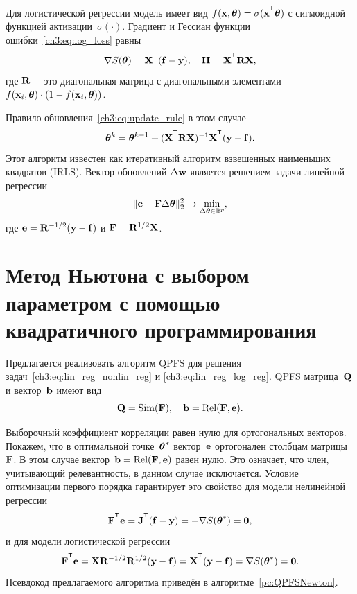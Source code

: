 Для логистической регрессии модель имеет вид $f(\bx , \btheta) = \sigma(\bx^{\T} \btheta)$ с сигмоидной функцией активации~$\sigma(\cdot)$.
Градиент и Гессиан функции ошибки~\eqref{ch3:eq:log_loss} равны
\begin{equation}
\nabla S(\btheta) = \bX^{\T} (\mathbf{f} - \by), \quad \bH = \bX^{\T} \bR \bX,
\label{ch3:eq:log_reg_deriv}
\end{equation}
где $\mathbf{R}$~-- это диагональная матрица с диагональными элементами $f(\mathbf{x}_i , \boldsymbol{\theta}) \cdot (1 - f(\mathbf{x}_i , \boldsymbol{\theta}))$.

Правило обновления~\eqref{ch3:eq:update_rule} в этом случае
\[
\btheta^k = \btheta^{k - 1} + (\bX^{\T} \bR \bX)^{-1} \bX^{\T} (\by - \mathbf{f}).
\]
Этот алгоритм известен как итеративный алгоритм взвешенных наименьших квадратов (IRLS). Вектор обновлений $\Delta \mathbf{w}$ является решением задачи линейной регрессии
\begin{equation}
\| \mathbf{e} - \mathbf{F} \Delta \boldsymbol{\theta} \|_2^2 \rightarrow \min_{\Delta \boldsymbol{\theta} \in \mathbb{R}^{p}},
\label{ch3:eq:lin_reg_log_reg}
\end{equation}
где $\mathbf{e} = \mathbf{R}^{-1/2} (\mathbf{y} - \mathbf{f})$ и $\mathbf{F} = \mathbf{R}^{1/2}\mathbf{X}$.

\section{Метод Ньютона с выбором параметром с помощью квадратичного программирования}

Предлагается реализовать алгоритм QPFS для решения задач~\eqref{ch3:eq:lin_reg_nonlin_reg} и \eqref{ch3:eq:lin_reg_log_reg}. 
QPFS матрица~$\mathbf{Q}$ и вектор~$\mathbf{b}$ имеют вид
\[
\mathbf{Q} = \text{Sim} (\mathbf{F}), \quad \mathbf{b} = \text{Rel} (\mathbf{F}, \mathbf{e}).
\]

Выборочный коэффициент корреляции равен нулю для ортогональных векторов.
Покажем, что в оптимальной точке~$\boldsymbol{\theta}^*$ вектор~$\mathbf{e}$ ортогонален столбцам матрицы~$\mathbf{F}$. 
В этом случае вектор~$\mathbf{b} = \text{Rel} (\mathbf{F}, \mathbf{e})$ равен нулю. Это означает, что член, учитывающий релевантность, в данном случае исключается.
Условие оптимизации первого порядка гарантирует это свойство для модели нелинейной регрессии
\[
\bF^{\T} \be = \bJ^{\T} (\mathbf{f} - \by) = - \nabla S(\btheta^*) = \boldsymbol{0},
\]
и для модели логистической регрессии
\[
\bF^{\T} \be = \bX \bR^{-1/2} \bR^{1/2} (\by - \mathbf{f}) = \bX^{\T} (\by - \mathbf{f}) = \nabla S(\btheta^*) = \boldsymbol{0}.
\]
Псевдокод предлагаемого алгоритма приведён в алгоритме~\ref{pc:QPFSNewton}.

